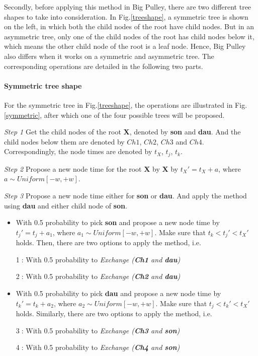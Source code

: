 \documentclass{bmcart}
\begin{document}
Secondly, before applying this method in Big Pulley, there are two different tree shapes to take into consideration. In Fig.\ref{treeshape}, a symmetric tree is shown on the left, in which both the child nodes of the root have child nodes. But in an asymmetric tree, only one of the child nodes of the root has child nodes below it, which means the other child node of the root is a leaf node. Hence, Big Pulley also differs when it works on a symmetric and asymmetric tree. The corresponding operations are detailed in the following two parts.
\paragraph*{Symmetric tree shape}

For the symmetric tree in Fig.\ref{treeshape}, the operations are illustrated in Fig.\ref{symmetric}, after which one of the four possible trees will be proposed.

\emph{Step 1} Get the child nodes of the root \textbf{X}, denoted by \textbf{son} and \textbf{dau}. And the child nodes below them are denoted by $Ch1$, $Ch2$, $Ch3$ and $Ch4$. Correspondingly, the node times are denoted by $t_X$, $t_j$, $t_k$.

\emph{Step 2} Propose a new node time for the root \textbf{X} by \textbf{X} by ${t_X}' = {t_X} + a$, where $a \sim Uniform[ - w, + w]$.

\emph{Step 3} Propose a new node time either for \textbf{son} or \textbf{dau}. And apply the method using \textbf{dau} and either child node of \textbf{son}.
\begin{itemize}
\item With 0.5 probability to pick \textbf{son} and propose a new node time by ${t_j}' = {t_j} + {a_1}$, where ${a_1} \sim Uniform[ - w, + w]$. Make sure that ${t_k} < {t_j}' < {t_X}'$ holds. Then, there are two options to apply the method, i.e.

\textcircled1: With 0.5 probability to \textit{Exchange (\textbf{Ch1} and \textbf{dau})}

\textcircled2: With 0.5 probability to \textit{Exchange (\textbf{Ch2} and \textbf{dau})}

\item With 0.5 probability to pick \textbf{dau} and propose a new node time by ${t_k}' = {t_k} + {a_2}$, where ${a_2} \sim Uniform[ - w, + w]$. Make sure that ${t_j} < {t_k}' < {t_X}'$ holds. Similarly, there are two options to apply the method, i.e.

\textcircled3: With 0.5 probability to \textit{Exchange (\textbf{Ch3} and \textbf{son})}

\textcircled4: With 0.5 probability to \textit{Exchange (\textbf{Ch4} and \textbf{son})}
\end{itemize}
\end{document}
